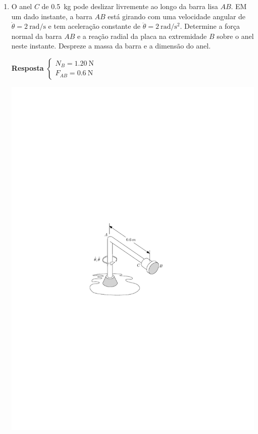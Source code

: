 \documentclass[a4paper,12pt]{article}
\begin{document}
\begin{enumerate}
		\item O anel $C$ de \SI{0.5}{\kilogram} pode deslizar livremente ao longo da barra lisa $AB$. EM um dado instante, a barra $AB$ está girando com uma  velocidade angular de $\dot{\theta}=\SI{2}{\radian/\second}$ e tem aceleração constante de $\ddot{\theta}=\SI{2}{\radian/\second^{2}}$. Determine a força normal da barra $AB$ e a reação radial da placa na extremidade $B$ sobre o anel neste instante. Despreze a massa da barra e a dimensão do anel.
		
		\textbf{Resposta}
		$
		\begin{cases}
		N_{B}=\SI{1.20}{\newton}\\
		F_{AB}=\SI{0.6}{\newton}
		\end{cases}
		$
		
		\vspace{-2cm}
		\begin{flushright}
			\includegraphics[scale=1.5]{images/draw_7.pdf}
		\end{flushright}
		

\end{enumerate}
\end{document}
